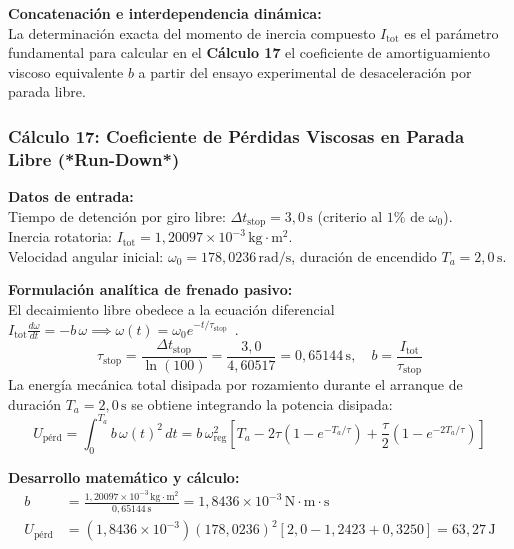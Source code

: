 \documentclass[12pt,a4paper]{article}
\begin{document}
\noindent\textbf{Concatenación e interdependencia dinámica:}\\
La determinación exacta del momento de inercia compuesto $I_{\text{tot}}$ es el parámetro fundamental para calcular en el \textbf{Cálculo 17} el coeficiente de amortiguamiento viscoso equivalente $b$ a partir del ensayo experimental de desaceleración por parada libre.
\vspace{12pt}

\subsubsection{Cálculo 17: Coeficiente de Pérdidas Viscosas en Parada Libre (*Run-Down*)}

\noindent\textbf{Datos de entrada:}\\
Tiempo de detención por giro libre: $\Delta t_{\text{stop}} = 3{,}0\,\text{s}$ (criterio al $1\%$ de $\omega_0$).\\
Inercia rotatoria: $I_{\text{tot}} = 1{,}20097\times 10^{-3}\,\text{kg}\cdot\text{m}^2$.\\
Velocidad angular inicial: $\omega_0 = 178{,}0236\,\text{rad/s}$, duración de encendido $T_a = 2{,}0\,\text{s}$.
\vspace{6pt}

\noindent\textbf{Formulación analítica de frenado pasivo:}\\
El decaimiento libre obedece a la ecuación diferencial $I_{\text{tot}} \frac{d\omega}{dt} = -b\,\omega \implies \omega(t) = \omega_0 e^{-t/\tau_{\text{stop}}}$~\cite{urinov2024}.
\begin{equation}
    \tau_{\text{stop}} = \frac{\Delta t_{\text{stop}}}{\ln(100)} = \frac{3{,}0}{4{,}60517} = 0{,}65144\,\text{s}, \quad b = \frac{I_{\text{tot}}}{\tau_{\text{stop}}}
\end{equation}
La energía mecánica total disipada por rozamiento durante el arranque de duración $T_a = 2{,}0\,\text{s}$ se obtiene integrando la potencia disipada:
\begin{equation}
    U_{\text{pérd}} = \int_0^{T_a} b\,\omega(t)^2 \, dt = b\,\omega_{\text{reg}}^2 \left[ T_a - 2\tau\left(1 - e^{-T_a/\tau}\right) + \frac{\tau}{2}\left(1 - e^{-2T_a/\tau}\right) \right]
\end{equation}
\vspace{6pt}

\noindent\textbf{Desarrollo matemático y cálculo:}
\begin{align}
    b &= \frac{1{,}20097 \times 10^{-3}\,\text{kg}\cdot\text{m}^2}{0{,}65144\,\text{s}} = \boxed{1{,}8436 \times 10^{-3}\,\text{N}\cdot\text{m}\cdot\text{s}} \\[6pt]
    U_{\text{pérd}} &= (1{,}8436 \times 10^{-3})(178{,}0236)^2 [2{,}0 - 1{,}2423 + 0{,}3250] = \boxed{63{,}27\,\text{J}}
\end{align}
\vspace{6pt}
\end{document}
